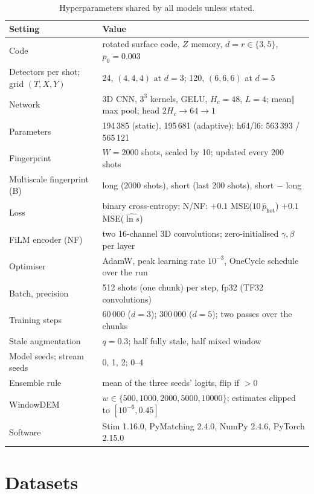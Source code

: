 \documentclass[11pt,a4paper]{article}
\begin{document}
\begin{table}[htbp]
\centering
\small
\begin{tabularx}{\linewidth}{@{}lX@{}}
\toprule
Setting & Value \\
\midrule
Code & rotated surface code, $Z$ memory, $d=r\in\{3,5\}$, $p_0=0.003$ \\
Detectors per shot; grid $(T,X,Y)$ & 24, $(4,4,4)$ at $d=3$; 120, $(6,6,6)$ at $d=5$ \\
Network & 3D CNN, $3^3$ kernels, GELU, $H_c=48$, $L=4$; mean$\Vert$max pool; head $2H_c\to64\to1$ \\
Parameters & 194\,385 (static), 195\,681 (adaptive); h64/l6: 563\,393 / 565\,121 \\
Fingerprint & $W=2000$ shots, scaled by 10; updated every 200 shots \\
Multiscale fingerprint (B) & long (2000 shots), short (last 200 shots), short $-$ long \\
Loss & binary cross-entropy; N/NF: $+0.1$ MSE($10\,\hat p_{\mathrm{hot}}$) $+0.1$ MSE($\widehat{\ln s}$) \\
FiLM encoder (NF) & two 16-channel 3D convolutions; zero-initialised $\gamma,\beta$ per layer \\
Optimiser & AdamW, peak learning rate $10^{-3}$, OneCycle schedule over the run \\
Batch, precision & 512 shots (one chunk) per step, fp32 (TF32 convolutions) \\
Training steps & 60\,000 ($d=3$); 300\,000 ($d=5$); two passes over the chunks \\
Stale augmentation & $q=0.3$; half fully stale, half mixed window \\
Model seeds; stream seeds & 0, 1, 2; 0--4 \\
Ensemble rule & mean of the three seeds' logits, flip if $>0$ \\
WindowDEM & $w\in\{500,1000,2000,5000,10000\}$; estimates clipped to $[10^{-6},0.45]$ \\
Software & Stim 1.16.0, PyMatching 2.4.0, NumPy 2.4.6, PyTorch 2.15.0 \\
\bottomrule
\end{tabularx}
\caption{Hyperparameters shared by all models unless stated.}
\label{tab:hyper}
\end{table}

\section{Datasets}\label{app:data}
\end{document}
